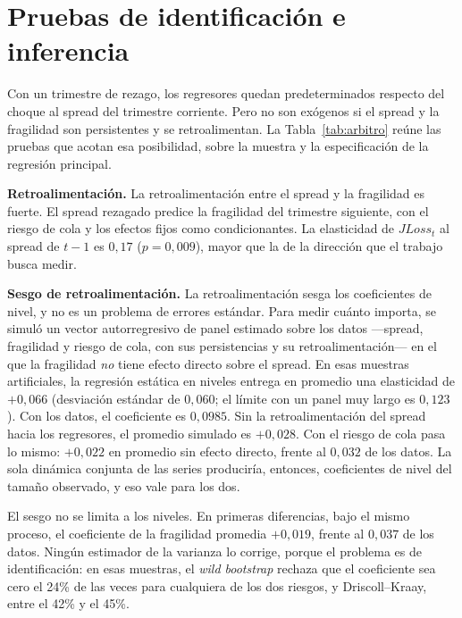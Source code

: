 \section{Pruebas de identificación e inferencia}
\label{sec:identificacion}

Con un trimestre de rezago, los regresores quedan predeterminados respecto del choque al spread del trimestre corriente. Pero no son exógenos si el spread y la fragilidad son persistentes y se retroalimentan. La Tabla~\ref{tab:arbitro} reúne las pruebas que acotan esa posibilidad, sobre la muestra y la especificación de la regresión principal.



\textbf{Retroalimentación.} La retroalimentación entre el spread y la fragilidad es fuerte. El spread rezagado predice la fragilidad del trimestre siguiente, con el riesgo de cola y los efectos fijos como condicionantes. La elasticidad de $JLoss_t$ al spread de $t-1$ es $0{,}17$ ($p=0{,}009$), mayor que la de la dirección que el trabajo busca medir.

\textbf{Sesgo de retroalimentación.} La retroalimentación sesga los coeficientes de nivel, y no es un problema de errores estándar. Para medir cuánto importa, se simuló un vector autorregresivo de panel estimado sobre los datos ---spread, fragilidad y riesgo de cola, con sus persistencias y su retroalimentación--- en el que la fragilidad \emph{no} tiene efecto directo sobre el spread. En esas muestras artificiales, la regresión estática en niveles entrega en promedio una elasticidad de $+0{,}066$ (desviación estándar de $0{,}060$; el límite con un panel muy largo es $0{,}123$). Con los datos, el coeficiente es $0{,}0985$. Sin la retroalimentación del spread hacia los regresores, el promedio simulado es $+0{,}028$. Con el riesgo de cola pasa lo mismo: $+0{,}022$ en promedio sin efecto directo, frente al $0{,}032$ de los datos. La sola dinámica conjunta de las series produciría, entonces, coeficientes de nivel del tamaño observado, y eso vale para los dos.

El sesgo no se limita a los niveles. En primeras diferencias, bajo el mismo proceso, el coeficiente de la fragilidad promedia $+0{,}019$, frente al $0{,}037$ de los datos. Ningún estimador de la varianza lo corrige, porque el problema es de identificación: en esas muestras, el \textit{wild bootstrap} rechaza que el coeficiente sea cero el 24\% de las veces para cualquiera de los dos riesgos, y Driscoll--Kraay, entre el 42\% y el 45\%.

